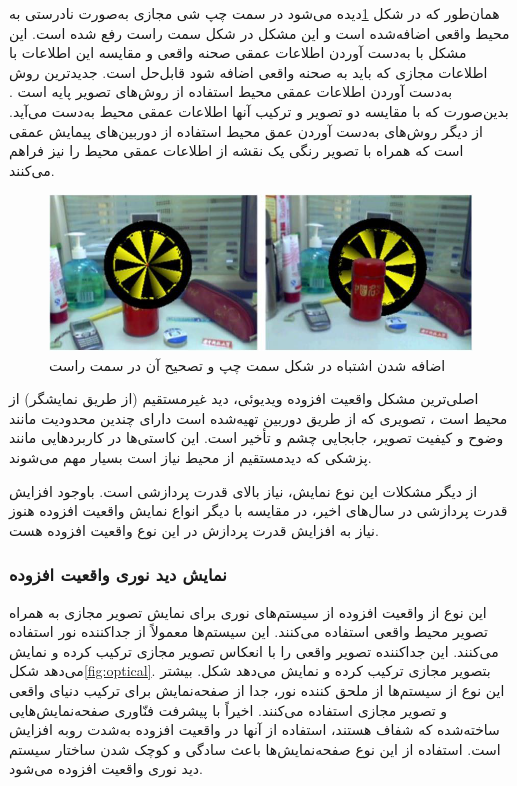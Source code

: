 همان‌طور که در شکل \ref{fig:Tian}دیده می‌شود در سمت چپ شی مجازی به‌صورت نادرستی به محیط واقعی اضافه‌شده است و این مشکل در شکل سمت راست رفع شده است. این مشکل با به‌دست آوردن اطلاعات عمقی صحنه واقعی و مقایسه این اطلاعات با اطلاعات مجازی که باید به صحنه واقعی اضافه شود قابل‌حل است. جدیدترین روش به‌دست آوردن اطلاعات عمقی محیط استفاده از روش‌های تصویر پایه است \cite{Billinghurst}.
بدین‌صورت که با مقایسه دو تصویر و ترکیب آنها اطلاعات عمقی محیط به‌دست می‌آید. از دیگر روش‌های به‌دست آوردن عمق محیط استفاده از دوربین‌های پیمایش عمقی است که همراه با تصویر رنگی یک نقشه از اطلاعات عمقی محیط را نیز فراهم می‌کنند.
\begin{figure}
	\centering
	\includegraphics[width=1\linewidth]{image/wrongpic}
	\caption {اضافه شدن اشتباه در شکل سمت چپ و تصحیح آن در سمت راست \cite{Tian}}
	\label{fig:Tian}
\end{figure}


اصلی‌ترین مشکل واقعیت افزوده ویدیوئی، دید غیرمستقیم (از طریق نمایشگر) از محیط است \cite{Billinghurst}، تصویری که از طریق دوربین تهیه‌شده است دارای چندین محدودیت مانند وضوح و کیفیت تصویر، جابجایی چشم و تأخیر است. این کاستی‌ها در کاربردهایی مانند پزشکی که دیدمستقیم از محیط نیاز است بسیار مهم می‌شوند.

از دیگر مشکلات این نوع نمایش، نیاز بالای قدرت پردازشی است. باوجود افزایش قدرت پردازشی در سال‌های اخیر، در مقایسه با دیگر انواع نمایش واقعیت افزوده هنوز نیاز به افزایش قدرت پردازش در این نوع واقعیت افزوده هست.

\subsubsection{نمایش دید نوری واقعیت افزوده}
این نوع از واقعیت افزوده از سیستم‌های نوری برای نمایش تصویر مجازی به همراه تصویر محیط واقعی استفاده می‌کنند. این سیستم‌ها معمولاً از جداکننده نور استفاده می‌کنند. این جداکننده تصویر واقعی را با انعکاس تصویر مجازی ترکیب کرده و نمایش می‌دهد شکل\ref{fig:optical}. بتصویر مجازی ترکیب کرده و نمایش می‌دهد شکل. بیشتر این نوع از سیستم‌ها از ملحق کننده نور، جدا از صفحه‌نمایش برای ترکیب دنیای واقعی و تصویر مجازی استفاده می‌کنند. اخیراً با پیشرفت فنّاوری صفحه‌نمایش‌هایی ساخته‌شده که شفاف هستند، استفاده از آنها در واقعیت افزوده به‌شدت روبه افزایش است. استفاده از این نوع صفحه‌نمایش‌ها باعث سادگی و کوچک شدن ساختار سیستم دید نوری واقعیت افزوده می‌شود\cite{Billinghurst}.

